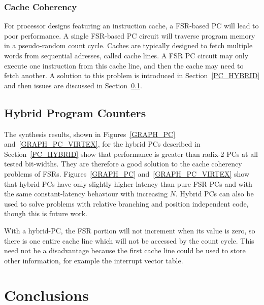 \documentclass[5p, twocolumn]{elsarticle}
\begin{document}
\subsubsection{Cache Coherency}
\label{MFSR_CACHE_COHERENCY}

For processor designs featuring an instruction cache, a FSR-based PC will lead to
poor performance. A single FSR-based PC circuit will traverse program memory in a
pseudo-random count cycle. Caches are typically designed to fetch multiple words
from sequential adresses, called cache lines. A FSR PC circuit may only execute
one instruction from this cache line, and then the cache may need to fetch
another. A solution to this problem is introduced in Section~\ref{PC_HYBRID} and
then issues are discussed in Section~\ref{HYBRID_CACHE_COHERENCY}.



\subsection{Hybrid Program Counters}
\label{HYBRID_CACHE_COHERENCY}

The synthesis results, shown in Figures~\ref{GRAPH_PC} and~\ref{GRAPH_PC_VIRTEX},
for the hybrid PCs described in Section~\ref{PC_HYBRID} show that performance is
greater than radix-2 PCs at all tested bit-widths. They are therefore a good
solution to the cache coherency problems of FSRs. Figures~\ref{GRAPH_PC}
and~\ref{GRAPH_PC_VIRTEX} show that hybrid PCs have only slightly higher latency
than pure FSR PCs and with the same constant-latency behaviour with increasing
$N$. Hybrid PCs can also be used to solve problems with relative branching and
position independent code, though this is future work.

With a hybrid-PC, the FSR portion will not increment when its value is zero, so
there is one entire cache line which will not be accessed by the count cycle.
This need not be a disadvantage because the first cache line could be used to
store other information, for example the interrupt vector table.

% 

\section{Conclusions}
\end{document}
